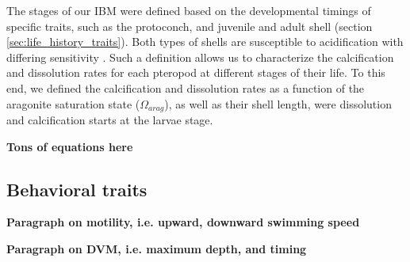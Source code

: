 The stages of our IBM were defined based on the developmental timings of specific traits, such as the protoconch, and juvenile and adult shell (section \ref{sec:life_history_traits}). Both types of shells are susceptible to acidification with differing sensitivity \citep{Bednarsek2017ApplicationPteropodShell,Thabet2015Lifestages}. Such a definition allows us to characterize the calcification and dissolution rates for each pteropod at different stages of their life. To this end, we defined the calcification and dissolution rates as a function of the aragonite saturation state ($\Omega_{arag}$), as well as their shell length, were dissolution and calcification starts at the larvae stage.


\textbf{Tons of equations here}




\subsection{Behavioral traits}

\textbf{Paragraph on motility, i.e. upward, downward swimming speed}

\textbf{Paragraph on DVM, i.e. maximum depth, and timing}







